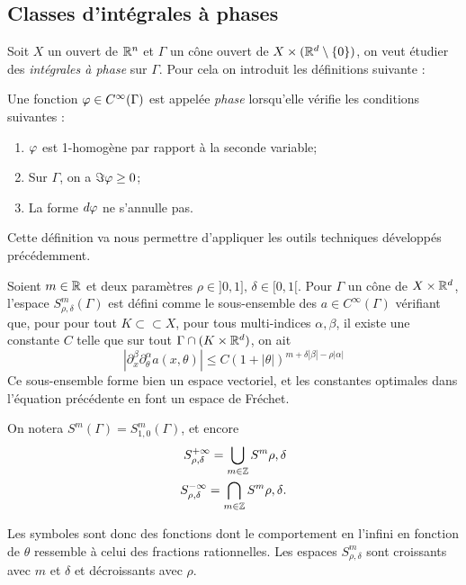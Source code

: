 \subsection{Classes d'intégrales à phases}
Soit $X$ un ouvert de $\mathbb{R}^n$ et $\Gamma$ un cône ouvert de $X \times (\mathbb{R}^d \setminus \{0\})$, on veut étudier des \emph{intégrales à phase} sur $\Gamma$. Pour cela on introduit les définitions suivante :

\begin{defn}Une fonction $\varphi \in C^{\infty}(\Gamma)$ est appelée \emph{phase} lorsqu'elle vérifie les conditions suivantes :
\begin{enumerate}
  \item $\varphi$ est 1-homogène par rapport à la seconde variable;
  \item Sur $\Gamma$, on a $\Im \varphi \geq 0$;
  \item La forme $d\varphi$ ne s'annulle pas.
\end{enumerate}
\end{defn}
Cette définition va nous permettre d'appliquer les outils techniques développés précédemment.

\begin{defn} Soient $m\in \mathbb{R}$ et deux paramètres $\rho \in ]0,1],\,\delta \in [0,1[$. Pour $\Gamma$ un cône de $X\times \mathbb{R}^d$, l'espace $S_{\rho,\delta}^m(\Gamma)$ est défini comme le sous-ensemble des $a \in C^\infty(\Gamma)$ vérifiant que, pour pour tout $K \subset \subset X$, pour tous multi-indices $\alpha,\beta$, il existe une constante $C$ telle que sur tout $\Gamma \cap (K\times \mathbb{R}^d)$, on ait
\begin{equation*}
  |\partial^{\beta}_x\partial^{\alpha}_{\theta}a(x,\theta)| \leq C(1+|\theta|)^{m+\delta|\beta|-\rho|\alpha|}
\end{equation*}
Ce sous-ensemble forme bien un espace vectoriel, et les constantes optimales dans l'équation précédente en font un espace de Fréchet.

On notera $S^m(\Gamma)=S^m_{1,0}(\Gamma)$, et encore
\begin{align*}
  S_{\rho,\delta}^{+\infty}=\bigcup_{m \in \mathbb{Z}}S^m{\rho,\delta}\\
  S_{\rho,\delta}^{-\infty}=\bigcap_{m \in \mathbb{Z}}S^m{\rho,\delta}.
\end{align*}
\end{defn}
Les symboles sont donc des fonctions dont le comportement en l'infini en fonction de $\theta$ ressemble à celui des fractions rationnelles. Les espaces $S^m_{\rho,\delta}$ sont croissants avec $m$ et $\delta$ et décroissants avec $\rho$.

